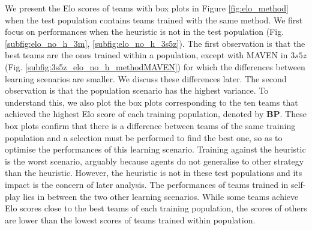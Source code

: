 We present the Elo scores of teams with box plots in Figure \ref{fig:elo_method} when the test population contains teams trained with the same method.
We first focus on performances when the heuristic is not in the test population (Fig. \ref{subfig:elo_no_h_3m}, \ref{subfig:elo_no_h_3s5z}).
The first observation is that the best teams are the ones trained within a population, except with MAVEN in $3s5z$ (Fig. \ref{subfig:3s5z_elo_no_h_methodMAVEN}) for which the differences between learning scenarios are smaller.
We discuss these differences later.
The second observation is that the population scenario has the highest variance.
To understand this, we also plot the box plots corresponding to the ten teams that achieved the highest Elo score of each training population, denoted by \textbf{BP}.
These box plots confirm that there is a difference between teams of the same training population and a selection must be performed to find the best one, so as to optimise the performances of this learning scenario.
Training against the heuristic is the worst scenario, arguably because agents do not generalise to other strategy than the heuristic.
However, the heuristic is not in these test populations and its impact is the concern of later analysis.
The performances of teams trained in self-play lies in between the two other learning scenarios.
While some teams achieve Elo scores close to the best teams of each training population, the scores of others are lower than the lowest scores of teams trained within population.

\begin{figure}[h]
 
\end{figure} 

